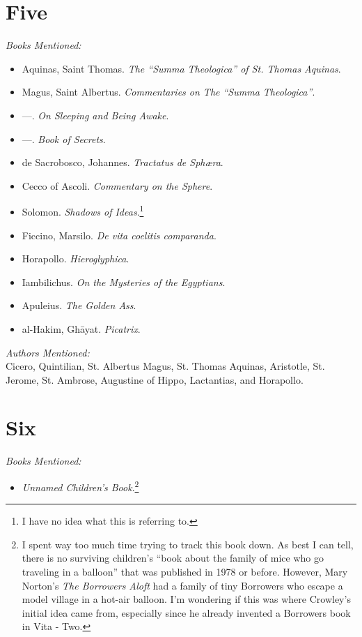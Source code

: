\documentclass[12pt,makeidx]{extreport}
\begin{document}
\section{Five}
\textit{Books Mentioned:}
\begin{itemize}
\item Aquinas, Saint Thomas. \textit{The “Summa Theologica” of St. Thomas Aquinas}.  \cite{Thomas1917}
\item Magus, Saint Albertus. \textit{Commentaries on The “Summa Theologica”}. \cite{Magus}
\item ---. \textit{On Sleeping and Being Awake}.
\item ---. \textit{Book of Secrets}.
\item de Sacrobosco, Johannes. \textit{Tractatus de Sphæra}. \cite{De}
\item Cecco of Ascoli. \textit{Commentary on the Sphere}. \cite{Cecco1250}
\item Solomon. \textit{Shadows of Ideas}.\footnote{I have no idea what this is referring to.}
\item Ficcino, Marsilo. \textit{De vita coelitis comparanda}. \cite{Ficcino}
\item Horapollo. \textit{Hieroglyphica}. \cite{Horapollo}
\item Iambilichus. \textit{On the Mysteries of the Egyptians}. \cite{Iambilichus}
\item Apuleius. \textit{The Golden Ass}. \cite{Apuleius1998}
\item al-Hakim, Ghāyat. \textit{Picatrix}. \cite{Picatrix1962}
\end{itemize}
\textit{Authors Mentioned:}\\
Cicero, Quintilian, St. Albertus Magus, St. Thomas Aquinas, Aristotle, St. Jerome, St. Ambrose, Augustine of Hippo, Lactantias, and Horapollo.

\section{Six}
\textit{Books Mentioned:}
\begin{itemize}
\item \textit{Unnamed Children's Book}.\footnote{I spent way too much time trying to track this book down. As best I can tell, there is no surviving children's ``book about the family of mice who go traveling in a balloon'' that was published in 1978 or before. However, Mary Norton's \textit{The Borrowers Aloft} had a family of tiny Borrowers who escape a model village in a hot-air balloon. I'm wondering if this was where Crowley's initial idea came from, especially since he already invented a Borrowers book in Vita - Two.}
\end{itemize}
\end{document}
